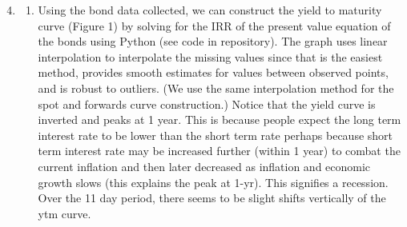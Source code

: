 \documentclass{article}
\begin{document}
\begin{enumerate}
\setcounter{enumi}{3} 
    \item \hfill
    \begin{enumerate}
        \item  
            Using the bond data collected, we can construct the yield to maturity curve \cite{hayes2023yield} (Figure 1) by solving for the IRR of the present value equation of the bonds using Python (see code in repository). The graph uses linear interpolation to interpolate the missing values since that is the easiest method, provides smooth estimates for values between observed points, and is robust to outliers. (We use the same interpolation method for the spot and forwards curve construction.) Notice that the yield curve is inverted and peaks at 1 year. This is because people expect the long term interest rate to be lower than the short term rate perhaps because short term interest rate may be increased further (within 1 year) to combat the current inflation and then later decreased as inflation and economic growth slows (this explains the peak at 1-yr). This signifies a recession. Over the 11 day period, there seems to be slight shifts vertically of the ytm curve.
            

\end{enumerate}
\end{enumerate}
\end{document}
